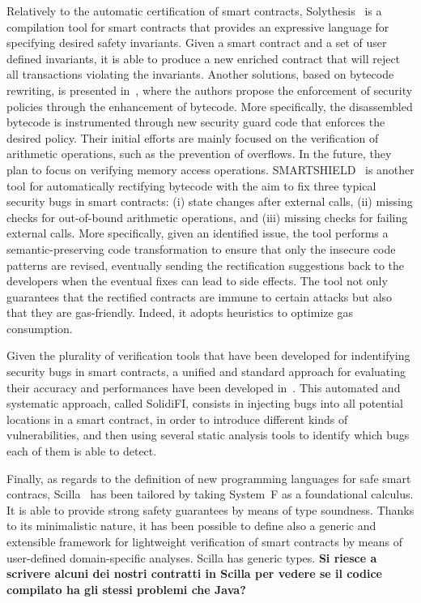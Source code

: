 Relatively to the automatic certification of smart contracts,
Solythesis~\cite{solythesis_solidity_validation} is a compilation tool for smart contracts
that provides an expressive language for specifying desired safety invariants.
Given a smart contract and a set of user defined invariants,
it is able to produce a new enriched contract that will reject all transactions
violating the invariants.
%
Another solutions, based on bytecode rewriting, is presented in~\cite{bytecode_rewriting},
where the authors propose the enforcement of security policies through the enhancement of bytecode.
More specifically, the disassembled bytecode is instrumented through new security guard code
that enforces the desired policy. Their initial efforts are mainly focused on the verification
of arithmetic operations, such as the prevention of overflows. In the future, they plan to focus on
verifying memory access operations.
%
SMARTSHIELD~\cite{smartshield} is another tool for automatically
rectifying bytecode with the aim to fix three typical security bugs in smart contracts:
(i) state changes after external calls, (ii) missing checks for out-of-bound arithmetic operations,
and (iii) missing checks for failing external calls. More specifically, given an identified issue,
the tool performs a semantic-preserving code transformation to ensure that only the insecure code
patterns are revised, eventually sending the rectification suggestions back to the developers
when the eventual fixes can lead to side effects. The tool not only guarantees that the rectified
contracts are immune to certain attacks but also that they are gas-friendly.
Indeed, it adopts heuristics to optimize gas consumption. 

Given the plurality of verification tools that have been developed for indentifying security bugs
in smart contracts, a unified and standard approach for evaluating their accuracy and performances
have been developed in~\cite{effectiveness_analysis_tools}. This automated and systematic approach,
called SolidiFI, consists in injecting bugs into all potential locations in a smart contract,
in order to introduce different kinds of vulnerabilities, and then using several static analysis
tools to identify which bugs each of them is able to detect.

Finally, as regards to the definition of new programming languages for safe smart contracs,
Scilla~\cite{scilla} has been tailored by taking System~F as a foundational calculus.
It is able to provide strong safety guarantees by means of type soundness.
Thanks to its minimalistic nature, it has been possible to define also a generic and extensible
framework for lightweight verification of smart contracts by means of user-defined domain-specific
analyses. Scilla has generic types. \textbf{Si riesce a scrivere alcuni dei nostri contratti in Scilla per vedere se il codice compilato ha gli stessi problemi che Java?}
